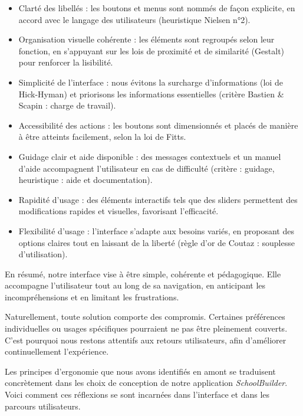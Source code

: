 \documentclass{mytex}
\begin{document}
\begin{itemize}
	\item Clarté des libellés : les boutons et menus sont nommés de façon explicite, en accord avec le langage des utilisateurs (heuristique Nielsen n°2).
	\item Organisation visuelle cohérente : les éléments sont regroupés selon leur fonction, en s’appuyant sur les lois de proximité et de similarité (Gestalt) pour renforcer la lisibilité.
	\item Simplicité de l’interface : nous évitons la surcharge d'informations (loi de Hick-Hyman) et priorisons les informations essentielles (critère Bastien \& Scapin : charge de travail).
	\item Accessibilité des actions : les boutons sont dimensionnés et placés de manière à être atteints facilement, selon la loi de Fitts.
	\item Guidage clair et aide disponible : des messages contextuels et un manuel d’aide accompagnent l’utilisateur en cas de difficulté (critère : guidage, heuristique : aide et documentation).
	\item Rapidité d’usage : des éléments interactifs tels que des sliders permettent des modifications rapides et visuelles, favorisant l’efficacité.
	\item Flexibilité d’usage : l’interface s’adapte aux besoins variés, en proposant des options claires tout en laissant de la liberté (règle d’or de Coutaz : souplesse d’utilisation).
\end{itemize}

En résumé, notre interface vise à être simple, cohérente et pédagogique. Elle accompagne l’utilisateur tout au long de sa navigation, en anticipant les incompréhensions et en limitant les frustrations.

Naturellement, toute solution comporte des compromis. Certaines préférences individuelles ou usages spécifiques pourraient ne pas être pleinement couverts. C’est pourquoi nous restons attentifs aux retours utilisateurs, afin d’améliorer continuellement l’expérience.


Les principes d’ergonomie que nous avons identifiés en amont se traduisent concrètement dans les choix de conception de notre application \textit{SchoolBuilder}. Voici comment ces réflexions se sont incarnées dans l’interface et dans les parcours utilisateurs.
\end{document}
